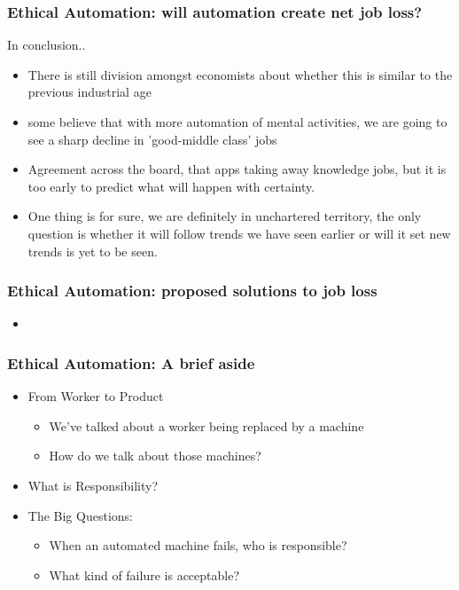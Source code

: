 \begin{frame}
	\frametitle{Ethical Automation: will automation create net job loss? }
	{\Large In conclusion..}
	\begin{itemize}
	\item There is still division amongst economists about whether this is similar to the previous industrial age
	\item some believe that with more automation of mental activities, we are going to see a sharp decline in 'good-middle class' jobs
	\item Agreement across the board, that apps taking away knowledge jobs, but it is too early to predict what will happen with certainty.
	\item One thing is for sure, we are definitely in unchartered territory, the only question is whether it will follow trends we have seen earlier or will it set new trends is yet to be seen.
	\end{itemize}
\end{frame}


\begin{frame}
  \frametitle{ Ethical Automation: proposed solutions to job loss}
  \begin{itemize}
  \item
  \end{itemize}
\end{frame}

\begin{frame}
  \frametitle{ Ethical Automation: A brief aside}
  \begin{itemize}
  \item From Worker to Product
    \begin{itemize}
    \item We've talked about a worker being replaced by a machine
    \item How do we talk about those machines?
    \end{itemize}
  \item What is Responsibility?
  \item The Big Questions:
    \begin{itemize}
    \item When an automated machine fails, who is responsible?
    \item What kind of failure is acceptable?
    \end{itemize}
  \end{itemize}
\end{frame}


